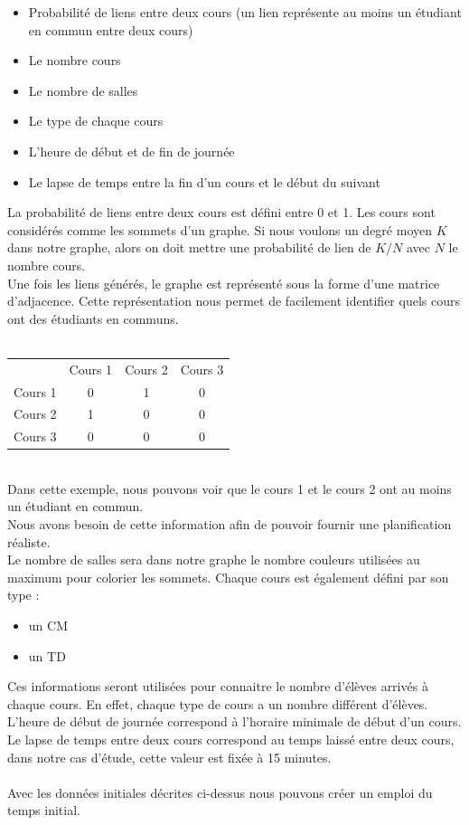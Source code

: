 \documentclass[a4paper,11pt]{article}
\begin{document}
	\begin{itemize}
		\item Probabilité de liens entre deux cours (un lien représente au moins un étudiant en commun entre deux cours)
		\item Le nombre cours
		\item Le nombre de salles 
		\item Le type de chaque cours 
		\item L'heure de début et de fin de journée
		\item Le lapse de temps entre la fin d'un cours et le début du suivant
	\end{itemize}

	La probabilité de liens entre deux cours est défini entre 0 et 1. Les cours sont considérés comme les sommets d'un graphe. Si nous voulons un degré moyen $K$ dans notre graphe, alors on doit mettre une probabilité de lien de $K/N$ avec $N$ le nombre cours.\\
	Une fois les liens générés, le graphe est représenté sous la forme d'une matrice d'adjacence. 
	Cette représentation nous permet de facilement identifier quels cours ont des étudiants en communs.\\
	\\
	\begin{tabular}{ | c | c | c | c |}
		\hline			
		\       & Cours 1 & Cours 2 & Cours 3\\
		Cours 1 &   0     &    1    &     0  \\
		Cours 2 &   1     &    0    &     0  \\
		Cours 3 &   0     &    0    &     0  \\
		\hline  
	\end{tabular}\\
	Dans cette exemple, nous pouvons voir que le cours 1 et le cours 2 ont au moins un étudiant en commun.\\
	Nous avons besoin de cette information afin de pouvoir fournir une planification réaliste.\\
	Le nombre de salles sera dans notre graphe le nombre couleurs utilisées au maximum pour colorier les sommets.
	Chaque cours est également défini par son type :
	\begin{itemize}
		\item un CM
		\item un TD
	\end{itemize}
	Ces informations seront utilisées pour connaitre le nombre d'élèves arrivés à chaque cours. En effet, chaque type de cours a un nombre différent d'élèves.\\
	L'heure de début de journée correspond à l'horaire minimale de début d'un cours.\\
	Le lapse de temps entre deux cours correspond au temps laissé entre deux cours, dans notre cas d'étude, cette valeur est fixée à 15 minutes.\\
	\\
	Avec les données initiales décrites ci-dessus nous pouvons créer un emploi du temps initial.
	
\end{document}
